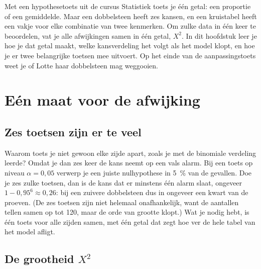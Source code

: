 Met een hypothesetoets uit de cursus Statistiek toets je één getal: een proportie of een gemiddelde. Maar een dobbelsteen heeft zes kansen, en een kruistabel heeft een vakje voor elke combinatie van twee kenmerken. Om zulke data in één keer te beoordelen, vat je alle afwijkingen samen in één getal, $X^2$. In dit hoofdstuk leer je hoe je dat getal maakt, welke kansverdeling het volgt als het model klopt, en hoe je er twee belangrijke toetsen mee uitvoert. Op het einde van de aanpassingstoets weet je of Lotte haar dobbelsteen mag weggooien.

\begin{oefeningen}[Start]

\end{oefeningen}


\section{Eén maat voor de afwijking}

\subsection{Zes toetsen zijn er te veel}

Waarom toets je niet gewoon elke zijde apart, zoals je met de binomiale verdeling leerde? Omdat je dan zes keer de kans neemt op een vals alarm. Bij een toets op niveau $\alpha = 0{,}05$ verwerp je een juiste nulhypothese in 5~\% van de gevallen. Doe je zes zulke toetsen, dan is de kans dat er minstens één alarm slaat, ongeveer $1 - 0{,}95^6 \approx 0{,}26$: bij een zuivere dobbelsteen dus in ongeveer een kwart van de proeven. (De zes toetsen zijn niet helemaal onafhankelijk, want de aantallen tellen samen op tot 120, maar de orde van grootte klopt.) Wat je nodig hebt, is één toets voor alle zijden samen, met één getal dat zegt hoe ver de hele tabel van het model afligt.

\subsection{De grootheid $X^2$}

